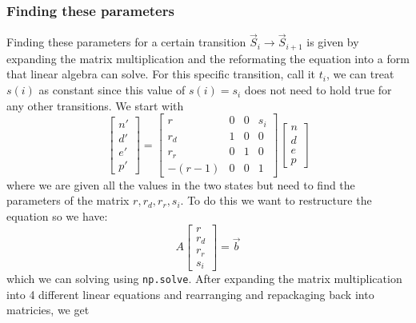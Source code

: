 \documentclass{report}
\begin{document}
            \subsubsection{Finding these parameters}
                Finding these parameters for a certain transition $\vec{S}_i \rightarrow \vec{S}_{i + 1}$ is given by expanding the matrix multiplication and the reformating the equation into a form that linear algebra can solve.
                \newline\indent
                For this specific transition, call it $t_i$, we can treat $s(i)$ as constant since this value of $s(i) = s_i$ does not need to hold true for any other transitions. We start with
                $$
                    \begin{bmatrix}
                        n' \\
                        d' \\
                        e' \\
                        p'
                    \end{bmatrix} = \begin{bmatrix}
                        r & 0 & 0 & s_i \\
                        r_d & 1 & 0 & 0 \\
                        r_r & 0 & 1 & 0 \\
                        -(r - 1) & 0 & 0 & 1
                    \end{bmatrix}\begin{bmatrix}
                        n \\
                        d \\
                        e \\
                        p
                    \end{bmatrix}
                $$
                where we are given all the values in the two states but need to find the parameters of the matrix $r, r_d, r_r, s_i$. To do this we want to restructure the equation so we have:
                $$
                    A\begin{bmatrix}
                        r \\
                        r_d \\
                        r_r \\
                        s_i
                    \end{bmatrix} = \vec{b}
                $$
                which we can solving using \lstinline{np.solve}. After expanding the matrix multiplication into 4 different linear equations and rearranging and repackaging back into matricies, we get
\end{document}
